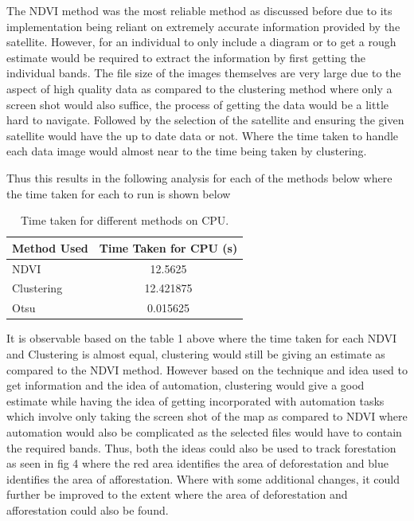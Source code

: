 \documentclass[12pt,a4paper,IEEEtran]{article}
\begin{document}
The NDVI method was the most reliable method as discussed before due to its implementation being reliant on extremely accurate information provided by the satellite. However, for an individual to only include a diagram or to get a rough estimate would be required to extract the information by first getting the individual bands. The file size of the images themselves are very large due to the aspect of high quality data as compared to the clustering method where only a screen shot would also suffice, the process of getting the data would be a little hard to navigate. Followed by the selection of the satellite and ensuring the given satellite would have the up to date data or not. Where the time taken to handle each data image would almost near to the time being taken by clustering. 

Thus this results in the following analysis for each of the methods below where the time taken for each to run is shown below  

\begin{table}[h]
	\centering
	\begin{tabular}{|l|c|}
	\hline
	\textbf{Method Used} & \textbf{Time Taken for CPU (s)} \\
	\hline
	NDVI & 12.5625 \\ 
	\hline
	Clustering & 12.421875 \\ 
	\hline
	Otsu & 0.015625 \\
	\hline
	\end{tabular}
	\caption{Time taken for different methods on CPU.}
	\label{tab:methods_time}
\end{table}
	
It is observable based on the table 1 above where the time taken for each NDVI and Clustering is almost equal, clustering would still be giving an estimate as compared to the NDVI method. However based on the technique and idea used to get information and the idea of automation, clustering would give a good estimate while having the idea of getting incorporated with automation tasks which involve only taking the screen shot of the map as compared to NDVI where automation would also be complicated as the selected files would have to contain the required bands. Thus, both the ideas could also be used to track forestation as seen in fig 4 where the red area identifies the area of deforestation and blue identifies the area of afforestation. Where with some additional changes, it could further be improved to the extent where the area of deforestation and afforestation could also be found. 
\end{document}
